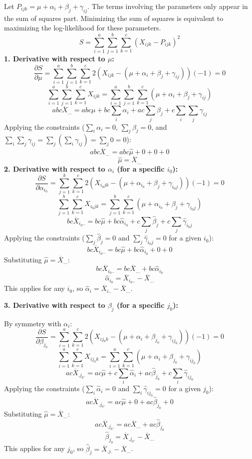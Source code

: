 Let $P_{ijk} = \mu + \alpha_i + \beta_j + \gamma_{ij}$. The terms involving the parameters only appear in the sum of squares part. Minimizing the sum of squares is equivalent to maximizing the log-likelihood for these parameters.
\[
S = \sum_{i=1}^{a} \sum_{j=1}^{b} \sum_{k=1}^{c} (X_{ijk} - P_{ijk})^2
\]
\textbf{1. Derivative with respect to $\mu$:}
\[
\frac{\partial S}{\partial \mu} = \sum_{i=1}^{a} \sum_{j=1}^{b} \sum_{k=1}^{c} 2(X_{ijk} - (\mu + \alpha_i + \beta_j + \gamma_{ij}))(-1) = 0
\]
\[
\sum_{i=1}^{a} \sum_{j=1}^{b} \sum_{k=1}^{c} X_{ijk} = \sum_{i=1}^{a} \sum_{j=1}^{b} \sum_{k=1}^{c} (\mu + \alpha_i + \beta_j + \gamma_{ij})
\]
\[
abc \overline{X}_{...} = abc\mu + bc\sum_i \alpha_i + ac\sum_j \beta_j + c\sum_i\sum_j \gamma_{ij}
\]
Applying the constraints ($\sum_i \alpha_i = 0$, $\sum_j \beta_j = 0$, and $\sum_i \sum_j \gamma_{ij} = \sum_j (\sum_i \gamma_{ij}) = \sum_j 0 = 0$):
\[
abc \overline{X}_{...} = abc\widehat{\mu} + 0 + 0 + 0
\]
\[
\widehat{\mu} = \overline{X}_{...}
\]
\textbf{2. Derivative with respect to $\alpha_i$ (for a specific $i_0$):}
\[
\frac{\partial S}{\partial \alpha_{i_0}} = \sum_{j=1}^{b} \sum_{k=1}^{c} 2(X_{i_0jk} - (\mu + \alpha_{i_0} + \beta_j + \gamma_{i_0j}))(-1) = 0
\]
\[
\sum_{j=1}^{b} \sum_{k=1}^{c} X_{i_0jk} = \sum_{j=1}^{b} \sum_{k=1}^{c} (\mu + \alpha_{i_0} + \beta_j + \gamma_{i_0j})
\]
\[
bc \overline{X}_{i_0..} = bc\widehat{\mu} + bc\widehat{\alpha}_{i_0} + c\sum_j \widehat{\beta}_j + c\sum_j \widehat{\gamma}_{i_0j}
\]
Applying the constraints ($\sum_j \widehat{\beta}_j = 0$ and $\sum_j \widehat{\gamma}_{i_0j} = 0$ for a given $i_0$):
\[
bc \overline{X}_{i_0..} = bc\widehat{\mu} + bc\widehat{\alpha}_{i_0} + 0 + 0
\]
Substituting $\widehat{\mu} = \overline{X}_{...}$:
\[
bc \overline{X}_{i_0..} = bc\overline{X}_{...} + bc\widehat{\alpha}_{i_0}
\]
\[
\widehat{\alpha}_{i_0} = \overline{X}_{i_0..} - \overline{X}_{...}
\]
This applies for any $i_0$, so $\widehat{\alpha}_i = \overline{X}_{i..} - \overline{X}_{...}$.

\textbf{3. Derivative with respect to $\beta_j$ (for a specific $j_0$):}

By symmetry with $\alpha_i$:
\[
\frac{\partial S}{\partial \beta_{j_0}} = \sum_{i=1}^{a} \sum_{k=1}^{c} 2(X_{ij_0k} - (\mu + \alpha_i + \beta_{j_0} + \gamma_{ij_0}))(-1) = 0
\]
\[
\sum_{i=1}^{a} \sum_{k=1}^{c} X_{ij_0k} = \sum_{i=1}^{a} \sum_{k=1}^{c} (\mu + \alpha_i + \beta_{j_0} + \gamma_{ij_0})
\]
\[
ac \overline{X}_{.j_0.} = ac\widehat{\mu} + c\sum_i \widehat{\alpha}_i + ac\widehat{\beta}_{j_0} + c\sum_i \widehat{\gamma}_{ij_0}
\]
Applying the constraints ($\sum_i \widehat{\alpha}_i = 0$ and $\sum_i \widehat{\gamma}_{ij_0} = 0$ for a given $j_0$):
\[
ac \overline{X}_{.j_0.} = ac\widehat{\mu} + 0 + ac\widehat{\beta}_{j_0} + 0
\]
Substituting $\widehat{\mu} = \overline{X}_{...}$:
\[
ac \overline{X}_{.j_0.} = ac\overline{X}_{...} + ac\widehat{\beta}_{j_0}
\]
\[
\widehat{\beta}_{j_0} = \overline{X}_{.j_0.} - \overline{X}_{...}
\]
This applies for any $j_0$, so $\widehat{\beta}_j = \overline{X}_{.j.} - \overline{X}_{...}$.

